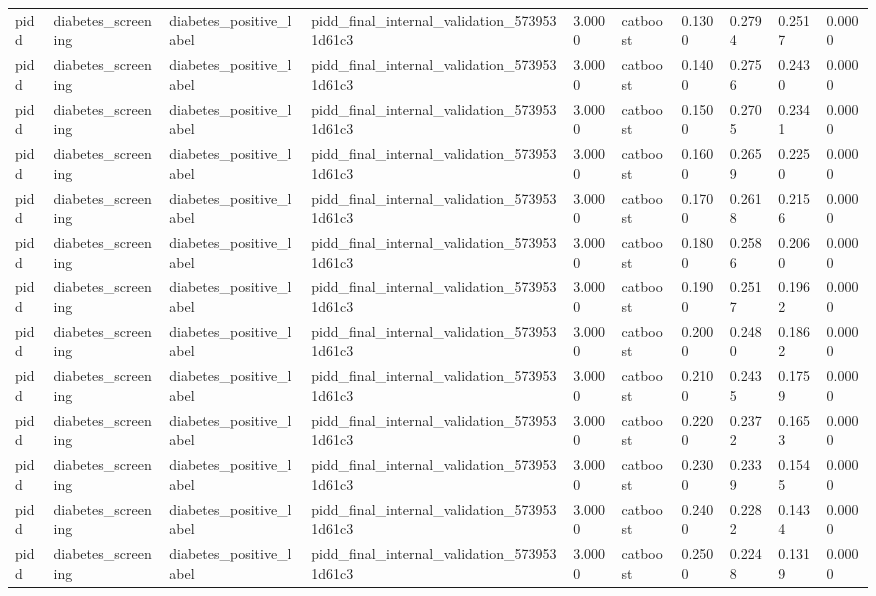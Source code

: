 \begin{tabular}{llllllllll}
pidd & diabetes\_screening & diabetes\_positive\_label & pidd\_final\_internal\_validation\_5739531d61c3 & 3.0000 & catboost & 0.1300 & 0.2794 & 0.2517 & 0.0000 \\
pidd & diabetes\_screening & diabetes\_positive\_label & pidd\_final\_internal\_validation\_5739531d61c3 & 3.0000 & catboost & 0.1400 & 0.2756 & 0.2430 & 0.0000 \\
pidd & diabetes\_screening & diabetes\_positive\_label & pidd\_final\_internal\_validation\_5739531d61c3 & 3.0000 & catboost & 0.1500 & 0.2705 & 0.2341 & 0.0000 \\
pidd & diabetes\_screening & diabetes\_positive\_label & pidd\_final\_internal\_validation\_5739531d61c3 & 3.0000 & catboost & 0.1600 & 0.2659 & 0.2250 & 0.0000 \\
pidd & diabetes\_screening & diabetes\_positive\_label & pidd\_final\_internal\_validation\_5739531d61c3 & 3.0000 & catboost & 0.1700 & 0.2618 & 0.2156 & 0.0000 \\
pidd & diabetes\_screening & diabetes\_positive\_label & pidd\_final\_internal\_validation\_5739531d61c3 & 3.0000 & catboost & 0.1800 & 0.2586 & 0.2060 & 0.0000 \\
pidd & diabetes\_screening & diabetes\_positive\_label & pidd\_final\_internal\_validation\_5739531d61c3 & 3.0000 & catboost & 0.1900 & 0.2517 & 0.1962 & 0.0000 \\
pidd & diabetes\_screening & diabetes\_positive\_label & pidd\_final\_internal\_validation\_5739531d61c3 & 3.0000 & catboost & 0.2000 & 0.2480 & 0.1862 & 0.0000 \\
pidd & diabetes\_screening & diabetes\_positive\_label & pidd\_final\_internal\_validation\_5739531d61c3 & 3.0000 & catboost & 0.2100 & 0.2435 & 0.1759 & 0.0000 \\
pidd & diabetes\_screening & diabetes\_positive\_label & pidd\_final\_internal\_validation\_5739531d61c3 & 3.0000 & catboost & 0.2200 & 0.2372 & 0.1653 & 0.0000 \\
pidd & diabetes\_screening & diabetes\_positive\_label & pidd\_final\_internal\_validation\_5739531d61c3 & 3.0000 & catboost & 0.2300 & 0.2339 & 0.1545 & 0.0000 \\
pidd & diabetes\_screening & diabetes\_positive\_label & pidd\_final\_internal\_validation\_5739531d61c3 & 3.0000 & catboost & 0.2400 & 0.2282 & 0.1434 & 0.0000 \\
pidd & diabetes\_screening & diabetes\_positive\_label & pidd\_final\_internal\_validation\_5739531d61c3 & 3.0000 & catboost & 0.2500 & 0.2248 & 0.1319 & 0.0000 \\

\end{tabular}
